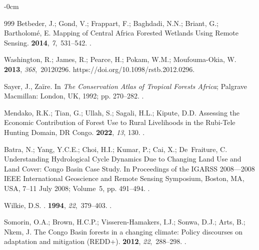\documentclass[applsci,article,accept,pdftex,moreauthors]{Definitions/mdpi}
\begin{document}
\begin{adjustwidth}{-\extralength}{0cm}
\begin{thebibliography}{999}
Betbeder, J.; Gond, V.; Frappart, F.; Baghdadi, N.N.; Briant, G.; Bartholomé,
  E.
\newblock Mapping of Central Africa Forested Wetlands Using Remote Sensing.
 {\bf 2014}, {\em 7},~531--542.
.

Washington, R.; James, R.; Pearce, H.; Pokam, W.M.; Moufouma-Okia, W.
 {\bf 2013}, {\em
  368},~20120296. 
  {{https://doi.org/10.1098/rstb.2012.0296}}.

Sayer, J., Za{\"i}re.
\newblock In {\em The Conservation Atlas of Tropical Forests Africa}; Palgrave
  Macmillan: London,   UK, 1992; pp. 270--282.
.

Mendako, R.K.; Tian, G.; Ullah, S.; Sagali, H.L.; Kipute, D.D.
\newblock Assessing the Economic Contribution of Forest Use to Rural
  Livelihoods in the Rubi-Tele Hunting Domain, DR Congo.
 {\bf 2022}, {\em 13}, 130.
.

Batra, N.; Yang, Y.C.E.; Choi, H.I.; Kumar, P.; Cai, X.; De~Fraiture, C.
\newblock Understanding Hydrological Cycle Dynamics Due to Changing Land Use
  and Land Cover: Congo Basin Case Study.
\newblock In Proceedings of the IGARSS 2008---2008 IEEE International
  Geoscience and Remote Sensing Symposium, Boston, MA, USA,  7--11 July 2008; %
 Volume~5, pp. 491--494.
.

Wilkie, D.S.
.
 {\bf 1994}, {\em 22},~379--403.
.

Somorin, O.A.; Brown, H.C.P.; Visseren-Hamakers, I.J.; Sonwa, D.J.; Arts, B.;
  Nkem, J.
\newblock The Congo Basin forests in a changing climate: Policy discourses on
  adaptation and mitigation (REDD+).
 {\bf 2012}, {\em 22},~288--298.
.


\end{thebibliography}
\end{adjustwidth}
\end{document}
